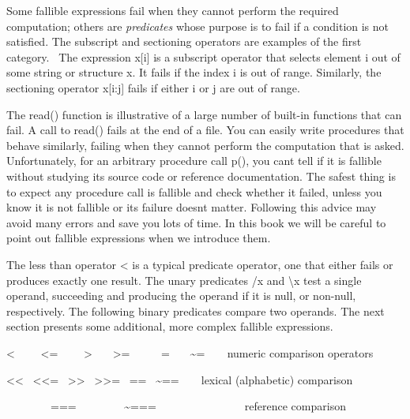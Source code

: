 Some fallible expressions fail when they cannot perform the required
computation; others are \textit{predicates} whose purpose is to fail if
a condition is not satisfied. The subscript and sectioning operators are examples of the first category. \ The
expression \textsf{x[i]} is a subscript
operator that selects element \textsf{i} out of some string or
structure \textsf{x}. It fails if the index \textsf{i} is out of range.
Similarly, the sectioning operator \textsf{x[i:j]} fails if either
\textsf{i} or \textsf{j} are out of range.

The \textsf{read()} function is illustrative of a large number of
built-in functions that can fail. A call to \textsf{read()} fails at
the end of a file. You can easily write procedures that behave
similarly, failing when they cannot perform the computation that is
asked. Unfortunately, for an arbitrary procedure call \textsf{p()}, you
can{\textquotesingle}t tell if it is fallible without studying its
source code or reference documentation. The safest
thing is to expect any procedure call is fallible and check whether it
failed, unless you know it is not fallible or its failure
doesn{\textquotesingle}t matter. Following this advice may avoid many
errors and save you lots of time. In this book we will be careful to
point out fallible expressions when we introduce them.

The less than operator \textsf{{\textless}} is a typical predicate
operator, one that either fails or produces exactly one result. The
unary predicates \textsf{/x} and \textsf{{\textbackslash}x} test a single
operand, succeeding and producing the operand if it is null, or
non-null, respectively. The following binary predicates compare two
operands. The next section presents some additional, more complex
fallible expressions.

\bigskip

\textsf{
{\textless} \ \ \ \ {\textless}= \ \ \ \ {\textgreater}
\ \ \ {\textgreater}= \ \ \ \ \ =
\ \ \ \~{}=}\texttt{\ \ }\ \ numeric
comparison operators

\textsf{{\textless}{\textless} \ {\textless}{\textless}=
\ {\textgreater}{\textgreater} \ {\textgreater}{\textgreater}= \ ==
\ \~{}==\ \ }\ \ lexical (alphabetic)
comparison

\ \ \ \ \ \ \ \ \textsf{=== \ \ \ \ \ \ \ \ \~{}===}\ \ \ \ \ \ \ \ \ \ \ \ \ \ \ \ reference comparison

